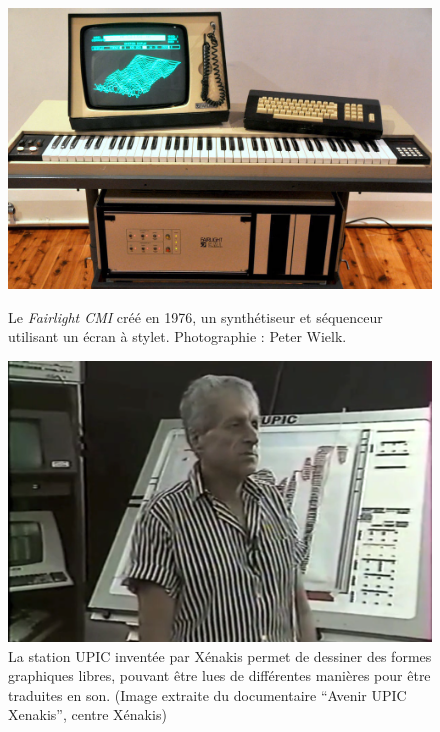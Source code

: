 \begin{figure}[!htbp]
	\captionsetup{format=plain}%
	\centering
	\begin{minipage}[t]{0.48\textwidth}
		\includegraphics[width=\linewidth]{gfx/05_interfaces/fairlight-CMI.jpg}
		\caption[Le Fairlight CMI]{Le \textit{Fairlight CMI} créé en 1976, un synthétiseur et séquenceur utilisant un écran à stylet. Photographie : Peter Wielk.}
		\label{fig:interface:fairlightCMI}
	\end{minipage}
	\hspace{.02\linewidth}
	\begin{minipage}[t]{0.48\textwidth}
	    \includegraphics[width=\linewidth]{gfx/05_interfaces/UPIC-Xenakis.png}
		\caption[L'UPIC de Iannis Xenakis]{La station UPIC inventée par Xénakis permet de dessiner des formes graphiques libres, pouvant être lues de différentes manières pour être traduites en son. (Image extraite du documentaire ``Avenir UPIC Xenakis'', centre Xénakis)}
		\label{fig:interface:UPIC}
	\end{minipage}
\end{figure}
